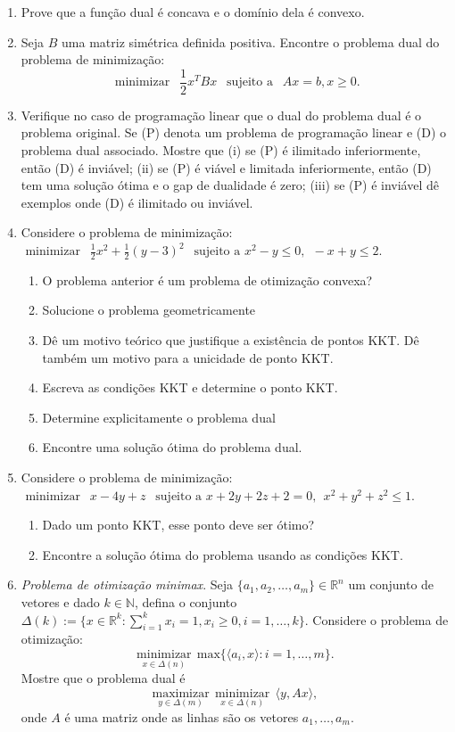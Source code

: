 \documentclass[a4paper,latin]{article}
\begin{document}
    \begin{enumerate}
    \item Prove que a função dual é concava e o domínio dela é convexo.	
    \item Seja $B$ uma matriz simétrica definida positiva. Encontre
    o problema dual do problema de minimização:
       $$ \text{ minimizar } \ \ \frac{1}{2} x^{T}Bx \ \ \text{ sujeito a } \ \ Ax=b, x \geq 0. $$ 
    \item Verifique no caso de programação linear que o dual do problema dual é o problema original. Se (P) denota um problema de programação linear e (D) o problema dual associado. Mostre que (i) se (P) é ilimitado inferiormente, então (D) é inviável; (ii) se (P) é viável e limitada inferiormente, então (D) tem uma solução ótima e o gap de dualidade é zero; (iii) se (P) é inviável dê exemplos onde (D) é ilimitado ou inviável.
    \item Considere o problema de minimização:  
    $ \text{ minimizar } \ \ \frac{1}{2}x^2+\frac{1}{2}(y-3)^2 \ \ \text{ sujeito a  } x^2-y \leq 0, \ \ -x+y \leq 2 $. 
    \begin{enumerate}
    	\item O problema anterior é um problema de otimização convexa?
    	\item Solucione o problema geometricamente 
    	\item Dê um motivo teórico que justifique a existência de pontos KKT. Dê também um motivo para a unicidade de ponto KKT.
    	\item Escreva as condições KKT e determine o ponto KKT.
    	\item Determine explicitamente o problema dual
    	\item Encontre uma solução ótima do problema dual. 
    \end{enumerate} 
    \item Considere o problema de minimização:  
    $ \text{ minimizar } \ \ x-4y+z \ \ \text{ sujeito a  } x+2y+2z+2=0, \ \ x^2+y^2+z^2 \leq 1 $. 
       \begin{enumerate}
       	\item Dado um ponto KKT, esse ponto deve ser ótimo?
       	\item Encontre a solução ótima do problema usando as condições KKT. 
       \end{enumerate} 
    \item {\it Problema de otimização minimax}. Seja $\{a_{1}, a_{2}, \dots, a_{m}\} \in \mathbb{R}^{n}$
    um conjunto de vetores e dado $k \in \mathbb{N}$, defina o conjunto 
    $\Delta(k):=\{x \in\mathbb{R}^k: \sum_{i=1}^{k} x_i=1, 
    x_i \geq 0, i=1,\dots,k \}$. 
    Considere o problema de otimização: 
    $$
    \underset{x \in \Delta(n)}{\text{minimizar}} \ \ 
    \text{max}\{ \langle a_{i}, x\rangle : i=1, \dots, m \}. $$
    Mostre que o problema dual é 
    $$
    \underset{y \in \Delta(m)}{\text{maximizar}} \ \
    \underset{x \in \Delta(n)}{\text{minimizar}} \ \ 
    \langle y, Ax \rangle ,$$
    onde $A$ é uma matriz onde as linhas são os vetores $a_{1}, \dots, a_{m}$.
    

\end{enumerate}
\end{document}
